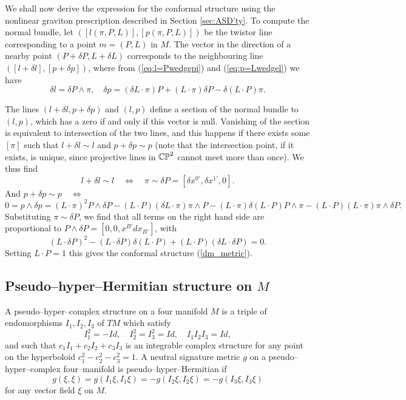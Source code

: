 We shall now derive the expression for the conformal structure using the nonlinear graviton prescription described in Section \ref{sec:ASD'ty}. To compute the normal bundle, let $([l(\pi, P, L)], 
[p(\pi, P, L)])$
be the twistor line corresponding to a point $m=(P, L)$ in $M$. The vector in the direction of a nearby point $(P+\delta P,L+\delta L)$ corresponds to the neighbouring line $([l+\delta l], [p+\delta p])$, where from (\ref{eq:l=Pwedgepi}) and (\ref{eq:p=Lwedgel}) we have
\[
\delta l=\delta P\wedge \pi, \quad
\delta p= (\delta L\cdot \pi)P+(L\cdot\pi) \delta P-\delta (L\cdot P)\pi.
\]

The lines  $(l+\delta l, p+\delta p)$  and $(l, p)$ define a section of the normal bundle to $(l,p)$, which has a zero if and only if this vector is null. Vanishing of the section is equivalent to intersection of the two lines, and this happens if there exists some $[\pi]$ such that $l+\delta l\sim l$ and $p+\delta p\sim p$ (note that the intersection point, if it exists, is unique, since projective lines in $\mathbb{CP}^2$ cannot meet more than once). We thus find
\[
l+\delta l\sim l \quad \iff \quad\pi\sim\delta P=[\delta x^{0'}, \delta x^{1'}, 0].
\]
And $p+\delta p\sim p \quad \iff$
\[
0=p\wedge \delta p=(L\cdot \pi)^2P\wedge \delta P-(L\cdot P)
(\delta L\cdot \pi)\pi\wedge P-(L\cdot \pi)\delta (L\cdot P)P\wedge \pi-
(L\cdot P)(L\cdot \pi) \pi\wedge \delta P.
\]
Substituting $\pi\sim\delta P$, we find that all terms on the right hand side are proportional to $P\wedge \delta P=[0, 0, x^{B'} dx_{B'}]$, with
\[
(L\cdot \delta P)^2-(L\cdot \delta P)\delta(L\cdot P)+(L\cdot P)(\delta L\cdot \delta P)=0.
\]
Setting $L\cdot P=1$ this gives the conformal structure 
(\ref{dm_metric}).
\subsection{Pseudo--hyper--Hermitian structure on $M$}
A pseudo--hyper--complex structure on a four manifold $M$ is a triple of endomorphisms
$I_1, I_2, I_3$ of $TM$ which satisfy
\[
I_1^2=-Id, \quad I_2^2=I_3^2=Id, \quad I_1I_2I_3=Id,
\]
and such that $c_1I_1+c_2I_2+c_3I_3$ is an integrable complex structure for any point 
on the hyperboloid $c_1^2-c_2^2-c_3^2=1$.
A neutral signature metric $g$ on a pseudo--hyper--complex four--manifold is pseudo--hyper--Hermitian
if
\[
g(\xi, \xi)=g(I_1\xi, I_1\xi)=-g(I_2\xi, I_2\xi)=-g(I_3\xi, I_3\xi)
\]
for any vector field $\xi$ on $M$.

